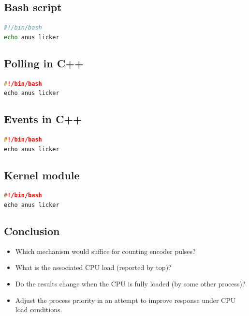 \documentclass{article}
\begin{document}
\subsection*{Bash script}\label{sub:Bash script} %
\begin{lstlisting}[language=bash,caption={Shell script},label=lst:shell-script]
#!/bin/bash
echo anus licker
\end{lstlisting}


\subsection*{Polling in C++}\label{sub:Polling in C++} %
\begin{lstlisting}[language=c++,caption={C++ application polling pin status using gpiod},label=lst:cpp-polling]
#!/bin/bash
echo anus licker
\end{lstlisting}


\subsection*{Events in C++}\label{sub:Events in C++} %
\begin{lstlisting}[language=c++,caption={C++ application reading pins using
events},label=lst:cpp-events]
#!/bin/bash
echo anus licker
\end{lstlisting}


\subsection*{Kernel module}\label{sub:Kernel module} %
\begin{lstlisting}[language=c,caption={Kernel module},label=lst:kernel-module]
#!/bin/bash
echo anus licker
\end{lstlisting}


\subsection*{Conclusion}


\begin{itemize}
	\item Which mechanism would suffice for counting encoder pulses?
	\item What is the associated CPU load (reported by top)?
	\item Do the results change when the CPU is fully loaded (by some other process)?
	\item Adjust the process priority in an attempt to improve response under CPU load conditions.
\end{itemize}
\end{document}
